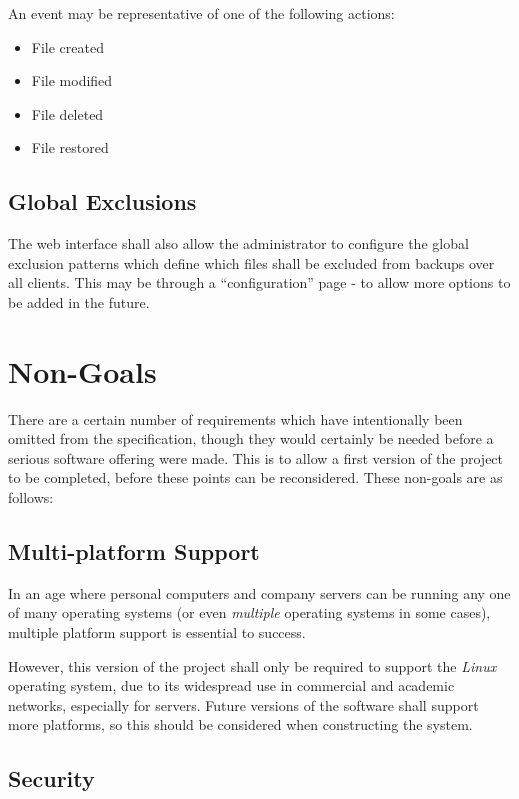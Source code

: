 An event may be representative of one of the following actions:

\begin{itemize}
    \item File created
    \item File modified
    \item File deleted
    \item File restored
\end{itemize}

\subsection{Global Exclusions}

The web interface shall also allow the administrator to configure the global
exclusion patterns which define which files shall be excluded from backups over
all clients. This may be through a ``configuration'' page - to allow more
options to be added in the future.

\section{Non-Goals}

There are a certain number of requirements which have intentionally been
omitted from the specification, though they would certainly be needed before
a serious software offering were made. This is to allow a first version of the
project to be completed, before these points can be reconsidered. These
non-goals are as follows:

\subsection{Multi-platform Support}

In an age where personal computers and company servers can be running any one
of many operating systems (or even \emph{multiple} operating systems in some
cases), multiple platform support is essential to success.

However, this version of the project shall only be required to support the
\emph{Linux} operating system, due to its widespread use in commercial and
academic networks, especially for servers. Future versions of the software
shall support more platforms, so this should be considered when constructing
the system.

\subsection{Security}

